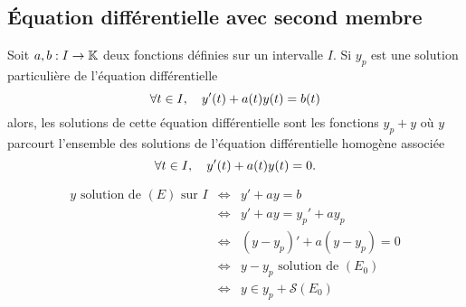 \documentclass{magnolia}
\begin{document}
\subsection{Équation différentielle avec second membre}

\begin{proposition}[utile=-3,nom={Théorème de superposition}]
Soit $a,b:I\to\mathbb{K}$ deux fonctions définies sur un intervalle $I$. Si
$y_p$ est une solution \og particulière \fg de l'équation différentielle
\[\forall t\in I,\quad y'(t)+a(t) y(t)=b(t)\]
alors, les solutions de cette équation différentielle sont les fonctions $y_p+y$
où $y$ parcourt l'ensemble des solutions de l'équation différentielle homogène
associée
\[\forall t\in I ,\quad y'(t)+a(t) y(t)=0.\]
\end{proposition}

\begin{preuve}
\begin{eqnarray*}
y \text{ solution de } (E) \text{ sur } I&\Longleftrightarrow & y'+ay=b \\
&\Longleftrightarrow & y'+ay=y_p'+ay_p \\
&\Longleftrightarrow &(y-y_p)'+a(y-y_p)=0\\
&\Longleftrightarrow & y-y_p \text{ solution de } (E_0)\\
&\Longleftrightarrow & y\in y_p+\mathcal{S}(E_0)
\end{eqnarray*}

\end{preuve}
\end{document}
